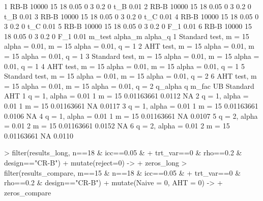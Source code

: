 \documentclass[12pt]{article}
\begin{document}
\begin{Schunk}
\begin{Soutput}
1   RB-B      10000 15 18 0.05       0 3 0.2  0        t_B  0.01
2   RB-B      10000 15 18 0.05       0 3 0.2  0        t_B  0.01
3   RB-B      10000 15 18 0.05       0 3 0.2  0        t_C  0.01
4   RB-B      10000 15 18 0.05       0 3 0.2  0        t_C  0.01
5   RB-B      10000 15 18 0.05       0 3 0.2  0        F_1  0.01
6   RB-B      10000 15 18 0.05       0 3 0.2  0        F_1  0.01
                 m_test              alpha_m             alpha_q
1 Standard test, m = 15 alpha = 0.01, m = 15 alpha = 0.01, q = 1
2      AHT test, m = 15 alpha = 0.01, m = 15 alpha = 0.01, q = 1
3 Standard test, m = 15 alpha = 0.01, m = 15 alpha = 0.01, q = 1
4      AHT test, m = 15 alpha = 0.01, m = 15 alpha = 0.01, q = 1
5 Standard test, m = 15 alpha = 0.01, m = 15 alpha = 0.01, q = 2
6      AHT test, m = 15 alpha = 0.01, m = 15 alpha = 0.01, q = 2
              q_alpha q  m_fac         UB Standard    AHT
1 q = 1, alpha = 0.01 1 m = 15 0.01163661   0.0112     NA
2 q = 1, alpha = 0.01 1 m = 15 0.01163661       NA 0.0117
3 q = 1, alpha = 0.01 1 m = 15 0.01163661   0.0106     NA
4 q = 1, alpha = 0.01 1 m = 15 0.01163661       NA 0.0107
5 q = 2, alpha = 0.01 2 m = 15 0.01163661   0.0152     NA
6 q = 2, alpha = 0.01 2 m = 15 0.01163661       NA 0.0110
\end{Soutput}
\begin{Sinput}
> filter(results_long, n==18 & icc==0.05 & 
+          trt_var==0 & rho==0.2 & design=="CR-B") %>%
+   mutate(reject=0) -> 
+   zeros_long
> filter(results_compare, m==15 & n==18 & icc==0.05 & 
+          trt_var==0 & rho==0.2 & design=="CR-B") %>%
+   mutate(Naive = 0, AHT = 0) -> 
+   zeros_compare
\end{Sinput}
\end{Schunk}
\end{document}
